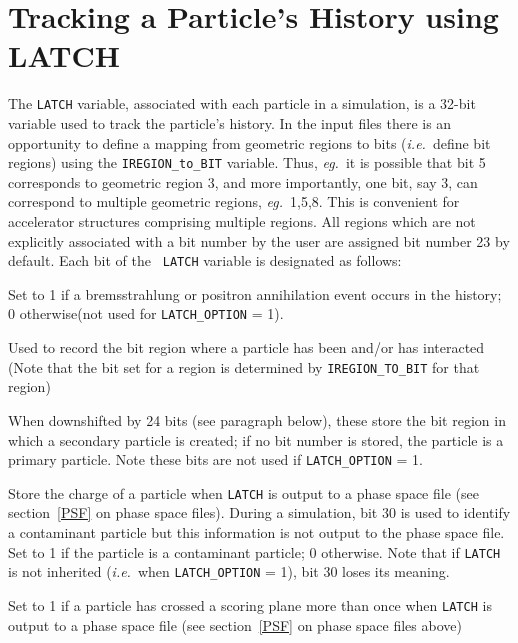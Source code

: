 \documentclass[12pt,twoside]{article}
\newcommand{\ie}{{\em i.e.}}
\newcommand{\eg}{{\em eg.}}
\begin{document}
\section{Tracking a Particle's History using LATCH}
\label{LATCH}

The \verb+LATCH+ variable, associated with each particle in a simulation, is a
32-bit variable used to track the particle's history. In the input files
there is an opportunity to define a mapping from geometric regions to
bits (\ie\ define bit regions)
using the \verb+IREGION_to_BIT+ variable.  Thus, \eg\ it is
possible that bit 5 corresponds to geometric region 3, and more
importantly, one bit, say 3, can correspond to multiple geometric
regions, \eg\ 1,5,8.  This is convenient for accelerator structures comprising
multiple regions.  All regions which are not explicitly associated with a bit
number by the user are assigned bit number 23 by default. Each bit of the {\tt
LATCH} variable is designated as follows:
\begin{description}

 
 
\item [bit 0] Set to 1 if a bremsstrahlung or positron annihilation
event occurs in the history; 0 otherwise(not used for \verb+LATCH_OPTION+ = 1).
\item [bit 1-23] Used to record the bit region where a particle has been and/or
has interacted (Note that the bit set for a region is determined by
\verb+IREGION_TO_BIT+ for that region)
\item [bit 24-28] When downshifted by 24 bits (see paragraph below), these store the bit
region in which a secondary particle
is created; if no bit number is stored, the particle is a primary
particle.  Note these bits are not used if \verb+LATCH_OPTION+ = 1.
\item [bit 29-30] Store the charge of a particle when \verb+LATCH+ is output
to a phase space file (see section~\ref{PSF} on phase space files).
During a simulation, bit 30 is used to identify  a contaminant particle
but this information is not output to the phase space file. Set to 1 if
the particle is a contaminant particle; 0 otherwise. Note that if
\verb+LATCH+ is not inherited (\ie\ when \verb+LATCH_OPTION+ = 1), bit 30
loses its meaning.
\item [bit 31] Set to 1 if a particle has crossed a scoring plane
more than once when \verb+LATCH+ is output to a phase space file
(see section~\ref{PSF} on phase space files above)
\end{description}
\end{document}
